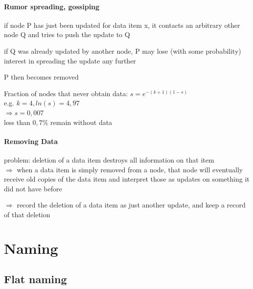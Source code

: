 \documentclass[ngerman,a4paper]{report}
\begin{document}
\subsubsection*{Rumor spreading, gossiping}
\begin{compactitem}
	\item if node P has just been updated for data item x, it contacts an arbitrary other node Q and tries to push the update to Q
	\item if Q was already updated by another node, P may lose (with some probability) interest in spreading the update any further
	\item P then becomes removed\item
	\item Fraction of nodes that never obtain data: $s=e^{-(k+1)(1-s)}$\\
		e.g. $k=4, ln(s) = 4,97$\\
		$\Rightarrow s = 0,007$\\
		less than $0,7\%$ remain without data\\
\end{compactitem}


\subsubsection*{Removing Data}
\begin{compactitem}
	\item problem: deletion of a data item destroys all information on that item\\
		$\Rightarrow$ when a data item is simply removed from a node, that node will eventually receive old copies of the data item and interpret those as updates on something it did not have before
	\item $\Rightarrow$ record the deletion of a data item as just another update, and keep a record of that deletion
\end{compactitem}


\chapter{Naming}
\section{Flat naming}
\end{document}
